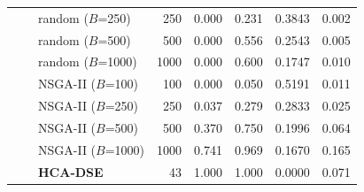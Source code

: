 \begin{tabular}{lllrrrrr}
 & & random ($B$=250) & 250 & 0.000 & 0.231 & 0.3843 & 0.002 \\
 & & random ($B$=500) & 500 & 0.000 & 0.556 & 0.2543 & 0.005 \\
 & & random ($B$=1000) & 1000 & 0.000 & 0.600 & 0.1747 & 0.010 \\
 & & NSGA-II ($B$=100) & 100 & 0.000 & 0.050 & 0.5191 & 0.011 \\
 & & NSGA-II ($B$=250) & 250 & 0.037 & 0.279 & 0.2833 & 0.025 \\
 & & NSGA-II ($B$=500) & 500 & 0.370 & 0.750 & 0.1996 & 0.064 \\
 & & NSGA-II ($B$=1000) & 1000 & 0.741 & 0.969 & 0.1670 & 0.165 \\
 & & \textbf{HCA-DSE} & 43 & 1.000 & 1.000 & 0.0000 & 0.071 \\
\bottomrule
\end{tabular}
